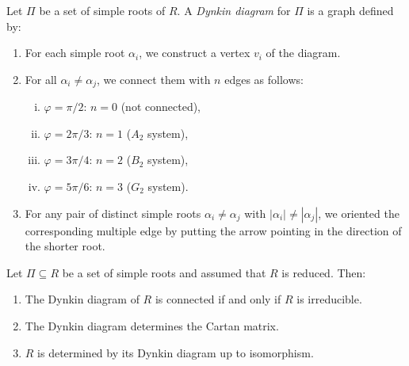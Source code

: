 \begin{definition}
  Let $\Pi$ be a set of
  simple roots of $R$.
  A \emph{Dynkin diagram}
  for $\Pi$ is a graph defined by:
  \begin{enumerate}
    \item For each simple root
      $\alpha_i$, we construct
      a vertex $v_i$ of the diagram.
    \item For all $\alpha_i \ne \alpha_j$,
      we connect them with
      $n$ edges as follows:
      \begin{enumerate}[(i)]
        \item $\varphi = \pi / 2$:
          $n = 0$ (not connected),
        \item $\varphi = 2\pi / 3$:
          $n = 1$ ($A_2$ system),
        \item $\varphi = 3\pi / 4$:
          $n = 2$ ($B_2$ system),
        \item $\varphi = 5\pi / 6$:
          $n = 3$ ($G_2$ system).
      \end{enumerate}
    \item For any pair of distinct
      simple roots $\alpha_i \ne \alpha_j$
      with $|\alpha_i| \ne |\alpha_j|$,
      we oriented the corresponding
      multiple edge by putting the
      arrow pointing in the direction
      of the shorter root.
  \end{enumerate}
\end{definition}

\begin{theorem}
  Let $\Pi \subseteq R$ be a set of
  simple roots and assumed that $R$ 
  is reduced. Then:
  \begin{enumerate}
    \item The Dynkin diagram of
      $R$ is connected if and only if
      $R$ is irreducible.
    \item The Dynkin diagram
      determines the Cartan matrix.
    \item $R$ is determined by its
      Dynkin diagram up to isomorphism.
  \end{enumerate}
\end{theorem}

